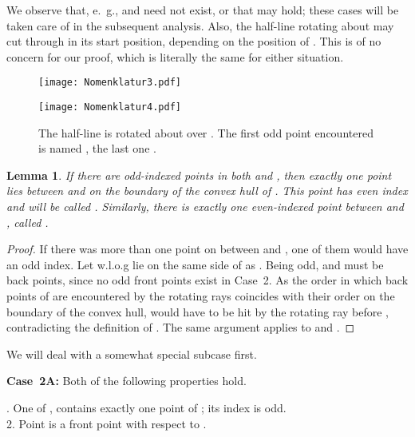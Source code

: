 \documentclass[11pt]{article}
\newtheorem{lemma}{Lemma}
\begin{document}
We observe that, e.~g.,  and  need not exist, or that  may hold; these cases will be taken
care of in the subsequent analysis. Also, the half-line rotating about  may cut through  in its
start position, depending on the position of . This is of no concern for our proof, which is literally the
same for either situation.
\begin{figure}[hbtp]\begin{minipage}[t]{0.4\textwidth}
\texttt{[image: Nomenklatur3.pdf]}\end{minipage}
\hspace{2cm}
\begin{minipage}[t]{0.4\textwidth}
\texttt{[image: Nomenklatur4.pdf]}\end{minipage}
\caption{The half-line is rotated about  over . The first odd point encountered is named , the last one . }
\label{Nomenklatur3-fig}
\end{figure}
\begin{lemma} If there are odd-indexed points in both  and , then exactly one point lies 
between  and  on the boundary of the convex hull of .
This point has even index and will be called . Similarly, there is exactly one even-indexed point between  and , 
called .
\end{lemma}

\begin{proof}
If there was more than one point on  between  and , 
one of them would have an odd index.
Let w.l.o.g  lie on the same side of  as . Being odd,  and  must be back points, since no
odd front points exist in Case~2.
As the order in which back points of  are encountered by the rotating rays 
coincides with their order on the boundary of the convex hull,
 would have to be hit by the rotating ray before , contradicting the definition of . 
The same argument applies to  and .
\end{proof}


We will deal with a somewhat special subcase first.
\vspace{0.5\baselineskip}

{\bf Case~2A:  } Both of the following properties hold.

. One of ,  contains exactly one point of ; its index is odd.\\
2. Point  is a front point with respect to .
\end{document}
